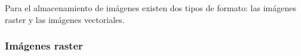 








Para el almacenamiento de imágenes existen dos tipos de formato: las imágenes
raster y las imágenes vectoriales.

\subsubsection{Imágenes raster}

